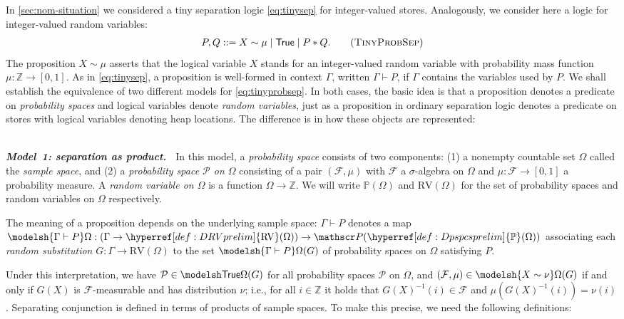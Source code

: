 \documentclass[
  sigconf,
  screen, ]{acmart}
\makeatletter
\theoremstyle{definition}
\newcommand\calF{\mathcal F}
\newcommand\calP{\mathcal P}
\newcommand\Z{\mathbb Z}
\newcommand{\labelword}[2]{\phantomsection
  #1\def\@currentlabel{\unexpanded{#1}}\label{#2}}
\newcommand\goodparagraph[1]{\hspace{0em}\\[-0.5em]\textbf{\textit{#1.~}}}
\newcommand\nref[2]{\hyperref[#1]{#2}} \newcommand\checkhigh{{\huge{\color{red}\textbf{TODO: check}}}}
\newcommand\powerset{\mathscr P}
\newcommand\trueprop{\mathsf{True}}
\newcommand\sepcon{\mathbin{*}}
\newcommand\Dpspcsprelim{{\nref{def:Dpspcsprelim}{\mathbb{P}}}}
\newcommand\DRVprelim{{\nref{def:DRVprelim}{\mathrm{RV}}}}
\makeatother
\begin{document}
In \cref{sec:nom-situation} we considered a tiny separation logic
\ref{eq:tinysep} for integer-valued stores.
Analogously, we consider here a logic
for integer-valued random variables:
\begin{align}
P,Q ::= X\sim \mu \mid \trueprop \mid P\sepcon Q.
\tag{\textsc{TinyProbSep}}
\label{eq:tinyprobsep}
\end{align}
The proposition $X\sim\mu$ asserts that the logical variable $X$
stands for an integer-valued random variable
with probability mass function $\mu : \Z\to[0,1]$.
As in \ref{eq:tinysep},
a proposition is well-formed in context $\Gamma$,
written $\Gamma\vdash P$,
if $\Gamma$ contains the variables used by $P$.
We shall establish the equivalence of two different models for \ref{eq:tinyprobsep}.
In both cases, the basic idea is that a proposition denotes a predicate
on \emph{probability spaces} and logical variables denote \emph{random
variables}, just as a proposition in ordinary separation logic
denotes a predicate on stores with logical variables denoting heap locations.
The difference is in how these objects are represented:


\goodparagraph{Model~1: separation as product}
In this model, a \emph{probability space}
consists of two components:
(1) a nonempty countable set $\Omega$
called the \emph{sample space},
and (2) a \emph{probability space $\calP{}$ on $\Omega$}
consisting of a pair $(\calF,\mu)$
with $\calF$ a $\sigma$-algebra on $\Omega$
and $\mu : \calF\to[0,1]$ a probability measure.
A \emph{random variable on $\Omega$}
is a function $\Omega\to\Z$.
\labelword{We}{def:Dpspcsprelim} \labelword{will}{def:DRVprelim} write $\Dpspcsprelim(\Omega)$
and $\DRVprelim(\Omega)$
for the set of probability spaces and random variables on $\Omega$ respectively.

The meaning of a proposition depends on the underlying sample space:
$\Gamma\vdash P$
denotes a map
$\modelsh{\Gamma\vdash P}\Omega
: (\Gamma\to \DRVprelim(\Omega))\to \powerset(\Dpspcsprelim(\Omega))$
associating each \emph{random substitution} $G : \Gamma\to\DRVprelim(\Omega)$
to the set
$\modelsh{\Gamma\vdash P}\Omega(G)$
of probability spaces on $\Omega$ satisfying $P$.

Under this interpretation, we have $\calP\in\modelsh\trueprop\Omega(G)$
for all probability spaces $\calP$ on $\Omega$,
and $(\calF,\mu)\in\modelsh{X\sim\nu}\Omega(G)$
if and only if $G(X)$ is $\calF$-measurable
and has distribution $\nu$; i.e., for all $i\in \Z$ it holds that
$G(X)^{-1}(i)\in\calF$
and $\mu(G(X)^{-1}(i)) = \nu(i)$.
Separating conjunction is defined in terms of products
of sample spaces. To make this precise, we need the following definitions:
\end{document}
